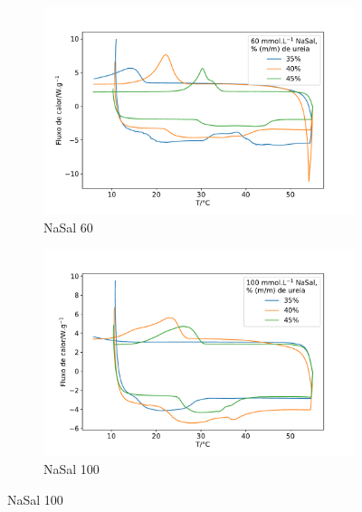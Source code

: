 \begin{figure}
	\begin{subfigure}{0.5\textwidth}
		\centering
		\includegraphics[width=\textwidth]{./imagens/dsc/NaSal60}
		\caption{NaSal 60 \mM}
		\label{fig:DSC_NaSal60}
	\end{subfigure}  %
	\begin{subfigure}{0.5\textwidth}
		\centering
		\includegraphics[width=\textwidth]{./imagens/dsc/NaSal100}
		\caption{NaSal 100 \mM}
		\label{fig:DSC_NaSal100}
	\end{subfigure}
	

\end{figure}
